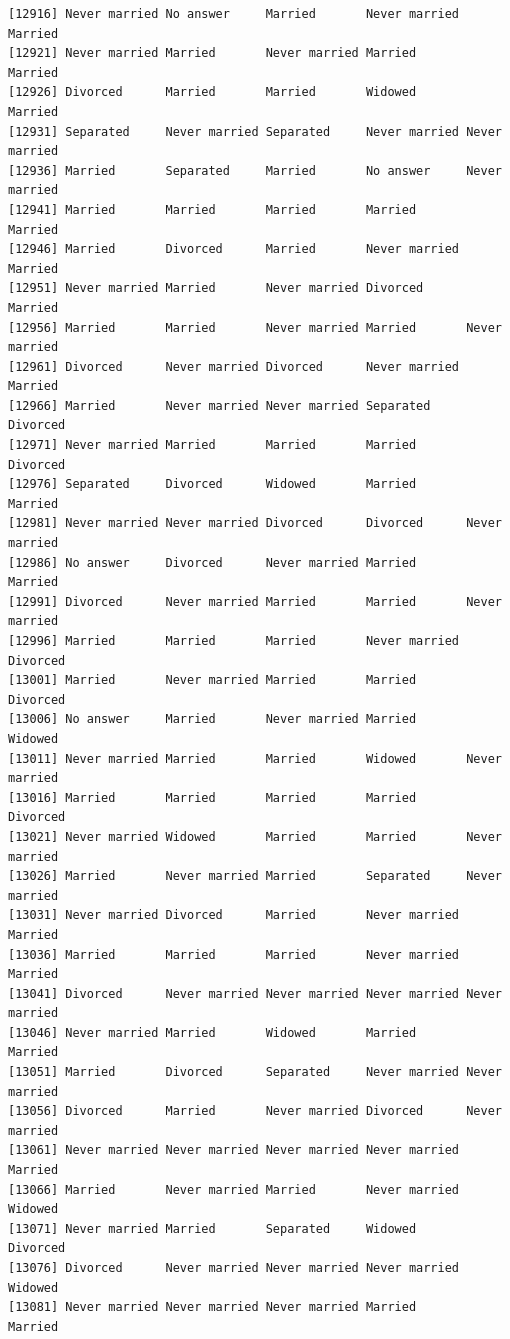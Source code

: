 \documentclass[
  letterpaper,
  DIV=11,
  numbers=noendperiod,
  oneside]{scrartcl}
\begin{document}
\begin{verbatim}
[12916] Never married No answer     Married       Never married Married      
[12921] Never married Married       Never married Married       Married      
[12926] Divorced      Married       Married       Widowed       Married      
[12931] Separated     Never married Separated     Never married Never married
[12936] Married       Separated     Married       No answer     Never married
[12941] Married       Married       Married       Married       Married      
[12946] Married       Divorced      Married       Never married Married      
[12951] Never married Married       Never married Divorced      Married      
[12956] Married       Married       Never married Married       Never married
[12961] Divorced      Never married Divorced      Never married Married      
[12966] Married       Never married Never married Separated     Divorced     
[12971] Never married Married       Married       Married       Divorced     
[12976] Separated     Divorced      Widowed       Married       Married      
[12981] Never married Never married Divorced      Divorced      Never married
[12986] No answer     Divorced      Never married Married       Married      
[12991] Divorced      Never married Married       Married       Never married
[12996] Married       Married       Married       Never married Divorced     
[13001] Married       Never married Married       Married       Divorced     
[13006] No answer     Married       Never married Married       Widowed      
[13011] Never married Married       Married       Widowed       Never married
[13016] Married       Married       Married       Married       Divorced     
[13021] Never married Widowed       Married       Married       Never married
[13026] Married       Never married Married       Separated     Never married
[13031] Never married Divorced      Married       Never married Married      
[13036] Married       Married       Married       Never married Married      
[13041] Divorced      Never married Never married Never married Never married
[13046] Never married Married       Widowed       Married       Married      
[13051] Married       Divorced      Separated     Never married Never married
[13056] Divorced      Married       Never married Divorced      Never married
[13061] Never married Never married Never married Never married Married      
[13066] Married       Never married Married       Never married Widowed      
[13071] Never married Married       Separated     Widowed       Divorced     
[13076] Divorced      Never married Never married Never married Widowed      
[13081] Never married Never married Never married Married       Married      

\end{verbatim}
\end{document}
